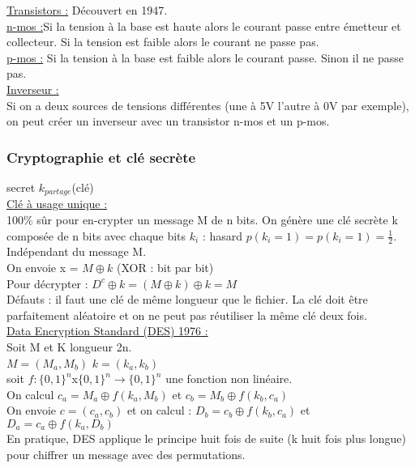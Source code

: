 \documentclass[../main.tex]{subfiles}
\begin{document}
\quad \underline{Transistors :} Découvert en 1947.\\
\underline{n-mos :}Si la tension à la base est haute alors le courant passe entre émetteur et collecteur. Si la tension est faible alors le courant ne passe pas.\\
\underline{p-mos :} Si la tension à la base est faible alors le courant passe. Sinon il ne passe pas.\\

\quad \underline{Inverseur :}\\
Si on a deux sources de tensions différentes (une à 5V l'autre à 0V par exemple), on peut créer un inverseur avec un transistor n-mos et un p-mos.\\

\subsubsection{Cryptographie et clé secrète}
secret $k_{partage}$(clé)\\
\quad \underline{Clé à usage unique :}\\
100\% sûr pour en-crypter un message M de n bits. On génère une clé secrète k composée de n bits avec chaque bits $k_i$ : hasard $p(k_i = 1) = p(k_i = 1) = \frac{1}{2}$. Indépendant du message M.\\

On envoie x = $M\oplus k$ (XOR : bit par bit)\\
Pour décrypter : $D ^c\oplus k = (M\oplus k)\oplus k = M$\\

Défauts : il faut une clé de même longueur que le fichier. La clé doit être parfaitement aléatoire et on ne peut pas réutiliser la même clé deux fois. \\

\quad \underline{Data Encryption Standard (DES) 1976 :}\\
Soit M et K longueur 2n.\\
$M = (M_a, M_b)$ $k = (k_a, k_b)$\\
soit $f:\{0,1\}^n$x$\{0,1\}^n \rightarrow \{0,1\}^n$ une fonction non linéaire.\\
On calcul $c_a = M_a\oplus f(k_a, M_b)$ et $c_b = M_b \oplus f(k_b, c_a)$\\
On envoie $c=(c_a, c_b)$ et on calcul : $D_b = c_b \oplus f(k_b, c_a)$ et $D_a = c_a\oplus f(k_a, D_b)$\\

En pratique, DES applique le principe huit fois de suite (k huit fois plus longue) pour chiffrer un message avec des permutations. \\
\end{document}
